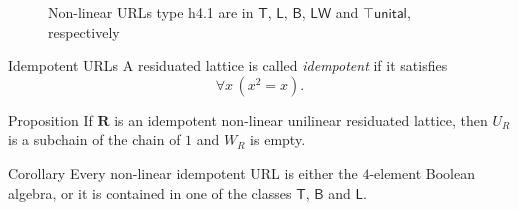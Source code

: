\documentclass[professionalfont, handout, 12pt]{beamer} %
\theoremstyle{plain}
\theoremstyle{definition}
\newcommand{\m}[1]{{\mathbf {#1} }}
\begin{document}
\begin{frame}{}
\begin{figure}
{
    }
\caption{Non-linear URLs type h4.1 are in $\mathsf{T}$, $\mathsf{L}$, $\mathsf{B}$, $\mathsf{LW}$ and $\top\mathsf{unital}$, respectively}
\end{figure}
\end{frame}

\begin{frame}{Idempotent URLs}
    A residuated lattice is called \emph{idempotent} if it satisfies
    \begin{equation}\tag{idem}\label{idempotent}
    \forall x \, (x^2 = x).
    \end{equation}
    \pause

    \begin{block}{Proposition}
        If $\m R$ is an idempotent non-linear unilinear residuated lattice, then $U_R$ is a subchain of the chain of $1$ and $W_R$ is empty.
    \end{block}
    \pause
    \medskip

    \begin{block}{Corollary}
        Every non-linear idempotent URL is either the $4$-element Boolean algebra, or it is contained in one of the classes $\mathsf{T}$, $\mathsf{B}$ and $\mathsf{L}$.
    \end{block}
\end{frame}
\end{document}
